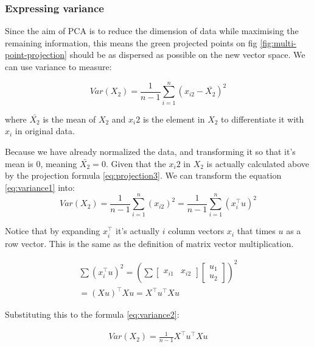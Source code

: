 \documentclass[stu,12pt,floatsintext]{apa7}
\begin{document}
\subsubsection{Expressing variance}

Since the aim of PCA is to reduce the dimension of data while maximising the remaining information, this means the green projected points on fig \ref{fig:multi-point-projection} should be as dispersed as possible on the new vector space. We can use variance to measure:

\begin{equation}
    \label{eq:variance1}
    Var(X_2)=\frac{1}{n-1} \sum^n_{i=1} (x_{i2}-\bar{X_2})^2
\end{equation}

where $\bar{X_2}$ is the mean of $X_2$ and $x_i2$ is the element in $X_2$ to differentiate it with $x_i$ in original data. 

Because we have already normalized the data, and transforming it so that it's mean is 0, meaning $\bar{X_2}=0$. Given that the $x_i2$ in $X_2$ is actually calculated above by the projection formula \ref{eq:projection3}. We can transform the equation \ref{eq:variance1} into:
\begin{equation}
    \label{eq:variance2}
    Var(X_2)=\frac{1}{n-1} \sum^n_{i=1} (x_{i2})^2=\frac{1}{n-1}\sum^n_{i=1} (x_i^\top  u)^2
\end{equation}
    
Notice that by expanding $x_i^\top $ it's actually $i$ column vectors $x_i$ that times $u$ as a row vector. This is the same as the definition of matrix vector multiplication.

\begin{gather}
    \sum (x_i^\top  u)^2=
    (\sum
    \begin{bmatrix}
        x_{i1} & x_{i2}
    \end{bmatrix}
    \begin{bmatrix}
        u_1\\
        u_2
    \end{bmatrix})^2\\
    =(Xu)^\top Xu
    =X^\top u^\top Xu
\end{gather}

Substituting this to the formula \ref{eq:variance2}:

\begin{gather}
    Var(X_2)=\frac{1}{n-1}X^\top u^\top Xu
\end{gather}
\end{document}
